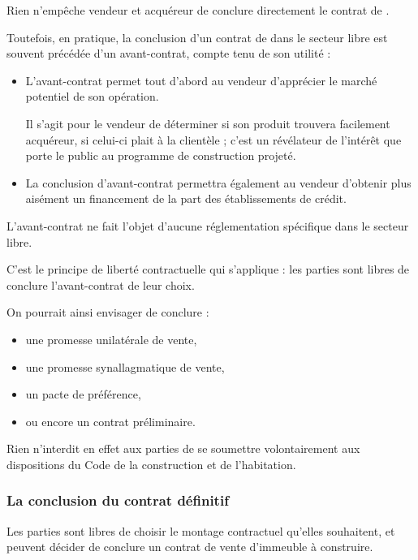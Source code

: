			Rien n’empêche vendeur et acquéreur de conclure directement le contrat de \VEFA.


			\bigbreak Toutefois, en pratique, la conclusion d’un contrat de \VEFA dans le secteur libre est souvent précédée d’un avant-contrat, compte tenu de son utilité :
			\begin{itemize}
				\item L’avant-contrat permet tout d’abord au vendeur d’apprécier le marché potentiel de son opération.

				Il s’agit pour le vendeur de déterminer si son produit trouvera facilement acquéreur, si celui-ci plait à la clientèle ; c’est un révélateur de l’intérêt que porte le public au programme de construction projeté.

				\item La conclusion d’avant-contrat permettra également au vendeur d’obtenir plus aisément un financement de la part des établissements de crédit.
			\end{itemize}





			\bigbreak L’avant-contrat ne fait l’objet d’aucune réglementation spécifique dans le secteur libre.

			C’est le principe de liberté contractuelle qui s’applique : les parties sont libres de conclure l’avant-contrat de leur choix.

			\medbreak On pourrait ainsi envisager de conclure :
			\begin{itemize}
				\item une promesse unilatérale de vente,
				\item une promesse synallagmatique de vente,
				\item un pacte de préférence,
				\item ou encore un contrat préliminaire.
			\end{itemize}

			Rien n’interdit en effet aux parties de se soumettre volontairement aux dispositions du Code de la construction et de l’habitation.

		\subsubsection{La conclusion du contrat définitif}

			Les parties sont libres de choisir le montage contractuel qu’elles souhaitent, et peuvent décider de conclure un contrat de vente d’immeuble à construire.

